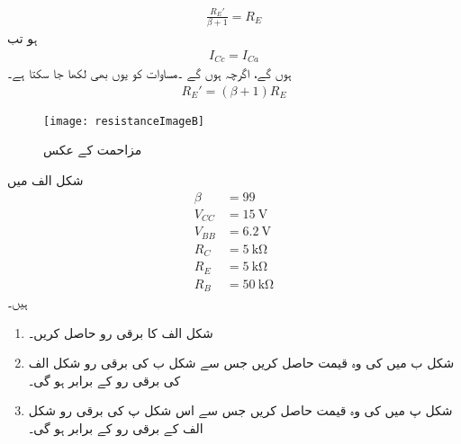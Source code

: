 \begin{align} \label{مساوات_ٹرانزسٹر_مخارج_کا_عکس_الف}
\frac{R_E'}{\beta+1}=R_E
\end{align}
ہو تب
\begin{align}
I_{Cc}=I_{Ca}
\end{align}
ہوں گے، اگرچہ   ہوں گے ۔مساوات   کو یوں بھی لکھا جا سکتا ہے۔
\begin{align} \label{مساوات_ٹرانزسٹر_مخارج_کا_عکس}
R_E'=\left (\beta+1 \right )R_E
\end{align}
%
\begin{figure}
\centering
\texttt{[image: resistanceImageB]}
\caption{مزاحمت کے عکس}
\label{شکل_دیگر_مزاحمت_کے_عکس}
\end{figure}


شکل  الف میں
\begin{align*}
\beta&=99\\
V_{CC}&=\SI{15}{\volt}\\
V_{BB}&=\SI{6.2}{\volt}\\
R_C&=\SI{5}{\kilo \ohm}\\
R_E&=\SI{5}{\kilo \ohm}\\
R_B & = \SI{50}{\kilo \ohm}
\end{align*}
ہیں۔
\begin{enumerate}
\item
شکل   الف کا برقی رو حاصل کریں۔
\item
شکل  ب میں   کی وہ قیمت حاصل کریں جس سے شکل  ب کی برقی 	رو شکل  الف   کی برقی رو کے برابر ہو گی۔
\item
شکل  پ میں  کی وہ قیمت حاصل کریں جس سے اس شکل  پ کی برقی رو شکل  الف   کے برقی رو کے برابر ہو گی۔
\end{enumerate}	
	
